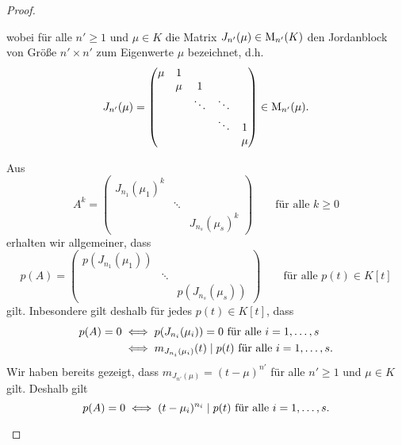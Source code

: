 \documentclass[a4paper,10pt]{scrartcl}
\begin{document}
\begin{proof}
\begin{itemize}
\[      \]
      wobei für alle $n' \geq 1$ und $\mu \in K$ die Matrix $J_{n'}(\mu) \in \operatorname{M}_{n'}(K)$ den Jordanblock von Größe $n' \times n'$ zum Eigenwerte $\mu$ bezeichnet, d.h.\
      \[
          J_{n'}(\mu)
        = \begin{pmatrix}
            \mu & 1   &         &         &         \\
                & \mu & 1       &         &         \\
                &     & \ddots  & \ddots  &         \\
                &     &         & \ddots  & 1       \\
                &     &         &         & \mu
          \end{pmatrix}
          \in \operatorname{M}_{n'}(\mu).
      \]
      
      
      Aus
      \[
          A^k
        = \begin{pmatrix}
            J_{n_1}(\mu_1)^k  &         &                   \\
                              & \ddots  &                   \\
                              &         & J_{n_s}(\mu_s)^k
          \end{pmatrix}
        \qquad
        \text{für alle $k \geq 0$}
      \]
      erhalten wir allgemeiner, dass
      \[
          p(A)
        = \begin{pmatrix}
            p( J_{n_1}(\mu_1) ) &         &                     \\
                                & \ddots  &                     \\
                                &         & p( J_{n_s}(\mu_s) )
          \end{pmatrix}
        \qquad
        \text{für alle $p(t) \in K[t]$}
      \]
      gilt.
      Inbesondere gilt deshalb für jedes $p(t) \in K[t]$, dass
      \begin{align*}
              p(A) = 0
        &\iff \text{$p( J_{n_i}(\mu_i) ) = 0$ für alle $i = 1, \dotsc, s$}
        \\
        &\iff \text{$m_{ J_{n_i}(\mu_i) }(t) \mathrel{|} p(t)$ für alle $i = 1, \dotsc, s$}.
      \end{align*}
      Wir haben bereits gezeigt, dass $m_{J_{n'}(\mu)} = (t - \mu)^{n'}$ für alle $n' \geq 1$ und $\mu \in K$ gilt.
      Deshalb gilt
      \begin{equation}
        \label{equation: characterization of vanishing polynomials}
              p(A) = 0
        \iff  \text{$(t - \mu_i)^{n_i} \mathrel{|} p(t)$ für alle $i = 1, \dotsc, s$}.
      \end{equation}
      

\end{itemize}
\end{proof}
\end{document}
